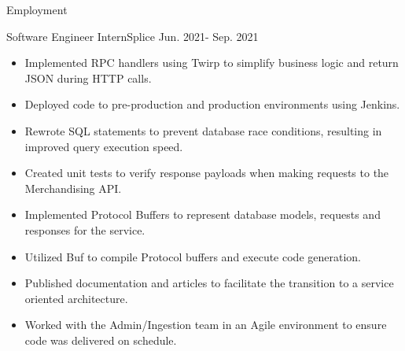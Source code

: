 \documentclass[]{johnsoncv}
\begin{document}
		\begin{cvsection}{Employment}
		\begin{cvsubsection}{Software Engineer Intern}{Splice} {Jun. 2021- Sep. 2021}
			\begin{itemize}
				\item Implemented RPC handlers using Twirp to simplify business logic and return JSON during HTTP calls.
				\item Deployed code to pre-production and production environments using Jenkins.
				\item Rewrote SQL statements to prevent database race conditions, resulting in improved query execution speed.
				\item Created unit tests to verify response payloads when making requests to the Merchandising API.
				\item Implemented Protocol Buffers to represent database models, requests and responses for the service.
				\item Utilized Buf to compile Protocol buffers and execute code generation.
				\item Published documentation and articles to facilitate the transition to a service oriented architecture.
				\item Worked with the Admin/Ingestion team in an Agile environment to ensure code was delivered on schedule.
			\end{itemize}
					\end{cvsubsection}
	\end{cvsection}
 
\end{document}

